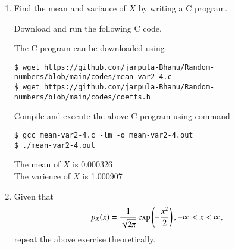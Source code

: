 \documentclass[journal,12pt,twocolumn]{IEEEtran}
\renewcommand\thesection{\arabic{section}}
\begin{document}
\begin{enumerate}[label=\thesection.\arabic*
,ref=\thesection.\theenumi]
\solution The PDF of $X$ is plotted in Fig. \ref{fig:gauss_pdf}
using the code below \\
Python code - \href{https://github.com/jarpula-Bhanu/Random-numbers/blob/main/codes/pdf_plot.py}{pdf\_plot.py}\\
The above code is executed using command
\begin{itemize}
    \item python3 pdf\_plot.py \\
\end{itemize}
\begin{figure}[h]
    \centering
    \texttt{[image: gauss\_pdf.png]}
    \caption{The PDF of $X$}
    \label{fig:gauss_pdf}
\end{figure}

\textbf{properties of pdf}
\begin{itemize}
    \item PDF is symmetric about $X$ = 0 
    \item Graph is bell shaped
    \item Mean of graph is situated at the apex point of the bell.\\
\end{itemize}

\item Find the mean and variance of $X$ by writing a C program.

\solution
Download and run the following C code.

\noindent The C program can be downloaded using
\begin{lstlisting}
$ wget https://github.com/jarpula-Bhanu/Random-numbers/blob/main/codes/mean-var2-4.c
$ wget https://github.com/jarpula-Bhanu/Random-numbers/blob/main/codes/coeffs.h
\end{lstlisting}
Compile and execute the above C program using command
\begin{lstlisting}
$ gcc mean-var2-4.c -lm -o mean-var2-4.out
$ ./mean-var2-4.out
\end{lstlisting}

The mean of $X$ is 0.000326\\
The varience of $X$ is 1.000907\\

\item Given that 
\begin{align}
p_{X}(x) = \frac{1}{\sqrt{2\pi}}\exp\left(-\frac{x^2}{2}\right), -\infty < x < \infty,
\end{align}
repeat the above exercise theoretically.


\end{enumerate}
\end{document}
